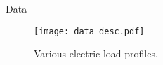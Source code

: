 \documentclass[notes]{beamer}
\begin{document}
\begin{frame}{Data}
\begin{figure}
\centering
\texttt{[image: data\_desc.pdf]}
\caption{Various electric load profiles.}
\label{fig:sums} 
\end{figure}
\end{frame}

\end{document}
